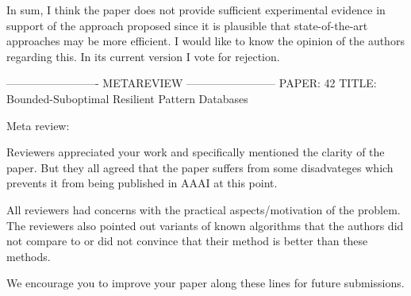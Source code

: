 In sum, I think the paper does not provide sufficient experimental
evidence in support of the approach proposed since it is plausible
that state-of-the-art approaches may be more efficient. I would like
to know the opinion of the authors regarding this. In its current
version I vote for rejection.


-------------------------  METAREVIEW  ------------------------
PAPER: 42
TITLE: Bounded-Suboptimal Resilient Pattern Databases

Meta review:

Reviewers appreciated your work and specifically mentioned the clarity of the paper. But they all agreed that the paper suffers from some disadvateges which prevents it from being published in AAAI at this point.

All reviewers had concerns with the practical aspects/motivation of the problem. The reviewers also pointed out variants of known algorithms that the authors did not compare to or did not convince that their method is better than these methods.

We encourage you to improve your paper along these lines for future submissions.